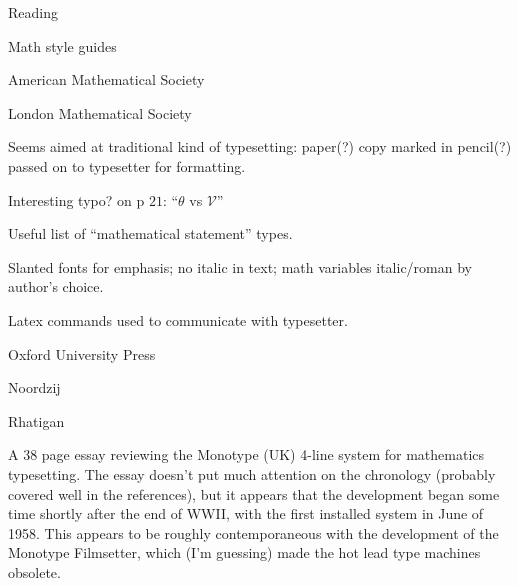 \documentclass[11pt]{PalisadesLakesBook}
\begin{document}
\begin{plSection}{Reading}
\begin{plSection}{Math style guides}
\begin{plSection}{American Mathematical Society}


\end{plSection}%
\begin{plSection}{London Mathematical Society}


Seems aimed at traditional kind of typesetting:
paper(?) copy marked in pencil(?)  
passed on to typesetter for formatting.

Interesting typo? on p $21$: ``$\theta$ vs $\mathscr{V}$''

Useful list of ``mathematical statement'' types.

Slanted fonts for emphasis; no italic in text;
math variables italic/roman by author's choice.

Latex commands used to communicate with typesetter.


\end{plSection}%
\begin{plSection}{Oxford University Press}


\end{plSection}%
\end{plSection}%
\begin{plSection}{Noordzij}



\end{plSection}%
\begin{plSection}{Rhatigan}
\begin{plSection}{}
\label{sec:FourLine}

A 38 page essay reviewing the Monotype (UK)
4-line system for mathematics typesetting.
The essay doesn't put much attention on the chronology
(probably covered well in the references),
but it appears that the development
began some time shortly after the end of WWII,
with the first installed system in June of 1958.
This appears to be roughly contemporaneous with
the development of the Monotype Filmsetter,
which (I'm guessing) made the hot lead type machines 
obsolete.~\cite{Eye:2012:MonotypeTimeline}


\end{plSection}
\end{plSection}
\end{plSection}
\end{document}
